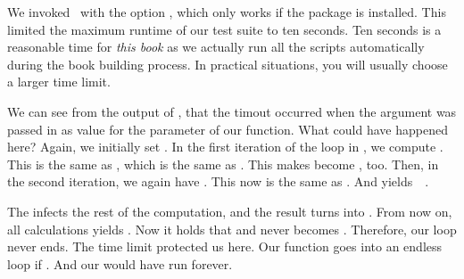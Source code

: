 We invoked \pytest\ with the option , which only works if the package  is installed.
This limited the maximum runtime of our test suite to ten seconds.
Ten seconds is a reasonable time for \emph{this book} as we actually run all the scripts automatically during the book building process.
In practical situations, you will usually choose a larger time limit.%
%
%
%
\begin{sloppypar}%
We can see from the output of \pytest, that the timout occurred when the argument  was passed in as value for the parameter  of our  function.
What could have happened here?
Again, we initially set .
In the first iteration of the loop in , we compute .
This is the same as , which is the same as .
This makes  become , too.
Then, in the second iteration, we again have .
This now is the same as .
And  yields~~\cite{G1991WECSSKAFPA}.
\end{sloppypar}%
%
The  infects the rest of the computation, and the result turns into .
From now on, all calculations yields .
Now it holds that  and  never becomes .
Therefore, our loop never ends.
The time limit protected us here.
Our  function goes into an endless loop if .
And our  would have run forever.

